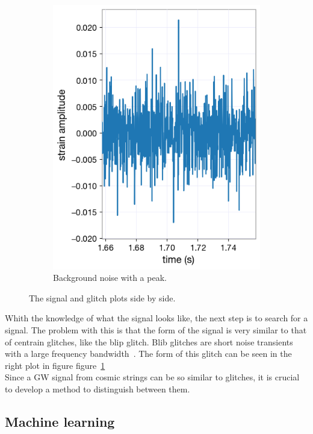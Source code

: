 \documentclass{article}
\begin{document}
\begin{multicols}{2}
\begin{figure}[H]
\begin{subfigure}[b]{0.49\columnwidth}
        \includegraphics[width=\linewidth]{../Dataplots/background3.png}
        \caption{Background noise with a peak.}
    \end{subfigure}
    \caption{The signal and glitch plots side by side.}
    \label{CS_signal_and_glitch}
\end{figure}
\indent
Whith the knowledge of what the signal looks like, the next step is to search for a signal.
The problem with this is that the form of the signal is very similar to that of centrain glitches, like the blip glitch.
Blib glitches are short noise transients with a large frequency bandwidth~\cite{Cabero_2019}. 
The form of this glitch can be seen in the right plot in figure figure~\ref{CS_signal_and_glitch}\\
\indent
Since a GW signal from cosmic strings can be so similar to glitches, it is crucial to develop a method to distinguish between them.

\subsection{Machine learning}



\end{multicols}
\end{document}
